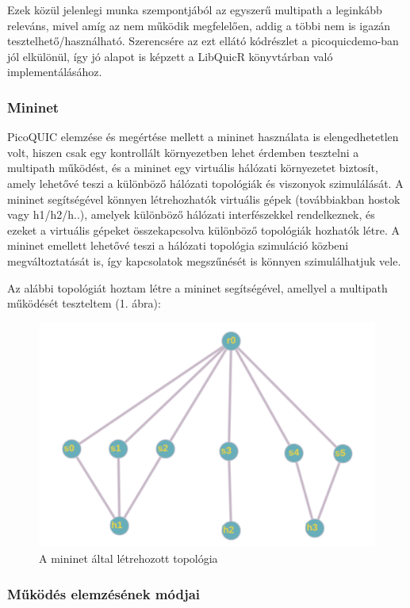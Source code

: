 \documentclass[a4paper,oneside]{article}
\begin{document}
Ezek közül jelenlegi munka szempontjából az egyszerű multipath a leginkább releváns,
mivel amíg az nem működik megfelelően, addig a többi nem is igazán tesztelhető/használható.
Szerencsére az ezt ellátó kódrészlet a picoquicdemo-ban jól elkülönül, így jó alapot is képzett
a LibQuicR könyvtárban való implementálásához.

\subsubsection{Mininet}

PicoQUIC elemzése és megértése mellett a mininet használata is 
elengedhetetlen volt, hiszen csak egy kontrollált környezetben 
lehet érdemben tesztelni a multipath működést, és a mininet 
egy virtuális hálózati környezetet biztosít, amely lehetővé teszi a különböző 
hálózati topológiák és viszonyok szimulálását. A mininet segítségével könnyen 
létrehozhatók virtuális gépek (továbbiakban hostok vagy h1/h2/h..), 
amelyek különböző hálózati interfészekkel rendelkeznek, 
és ezeket a virtuális gépeket összekapcsolva különböző topológiák 
hozhatók létre. A mininet emellett lehetővé teszi a hálózati topológia 
szimuláció közbeni megváltoztatását is, így kapcsolatok megszűnését 
is könnyen szimulálhatjuk vele.

Az alábbi topológiát hoztam létre a mininet segítségével, amellyel a multipath működését teszteltem (1. ábra):
\begin{figure}[h]
    \centering
      \includegraphics[width=12cm]{topo}
  \caption{A mininet által létrehozott topológia}
  \end{figure}


\subparagraph{}

\subsubsection{Működés elemzésének módjai}
\end{document}
